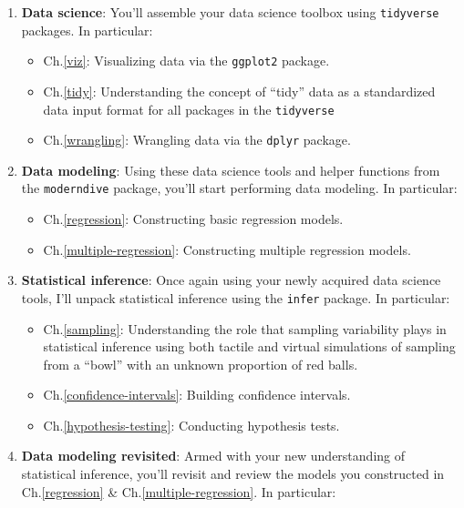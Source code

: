 \documentclass[
  12pt, krantz2,
]{krantz}
\providecommand{\tightlist}{%
  \setlength{\itemsep}{0pt}\setlength{\parskip}{0pt}}
\begin{document}
\begin{enumerate}
\def\labelenumi{\arabic{enumi}.}
\tightlist
\item
  \textbf{Data science}: You'll assemble your data science toolbox using \texttt{tidyverse} packages. In particular:

  \begin{itemize}
  \tightlist
  \item
    Ch.\ref{viz}: Visualizing data via the \texttt{ggplot2} package.
  \item
    Ch.\ref{tidy}: Understanding the concept of ``tidy'' data as a standardized data input format for all packages in the \texttt{tidyverse}
  \item
    Ch.\ref{wrangling}: Wrangling data via the \texttt{dplyr} package.
  \end{itemize}
\item
  \textbf{Data modeling}: Using these data science tools and helper functions from the \texttt{moderndive} package, you'll start performing data modeling. In particular:

  \begin{itemize}
  \tightlist
  \item
    Ch.\ref{regression}: Constructing basic regression models.
  \item
    Ch.\ref{multiple-regression}: Constructing multiple regression models.
  \end{itemize}
\item
  \textbf{Statistical inference}: Once again using your newly acquired data science tools, I'll unpack statistical inference using the \texttt{infer} package. In particular:

  \begin{itemize}
  \tightlist
  \item
    Ch.\ref{sampling}: Understanding the role that sampling variability plays in statistical inference using both tactile and virtual simulations of sampling from a ``bowl'' with an unknown proportion of red balls.
  \item
    Ch.\ref{confidence-intervals}: Building confidence intervals.
  \item
    Ch.\ref{hypothesis-testing}: Conducting hypothesis tests.
  \end{itemize}
\item
  \textbf{Data modeling revisited}: Armed with your new understanding of statistical inference, you'll revisit and review the models you constructed in Ch.\ref{regression} \& Ch.\ref{multiple-regression}. In particular:


\end{enumerate}
\end{document}
